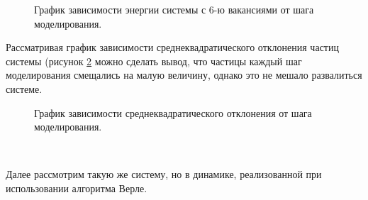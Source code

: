 \documentclass[14pt,a4paper,report]{ncc}
\begin{document}
\begin{figure}[h]
\caption{График зависимости энергии системы с 6-ю вакансиями от шага моделирования.}
\label{ris:image8}
\end{figure}
Рассматривая график зависимости среднеквадратического отклонения частиц системы (рисунок \ref{ris:image9} можно сделать вывод, что частицы каждый шаг моделирования смещались на малую величину, однако это не мешало развалиться системе. 
\begin{figure}[h]
\caption{График зависимости среднеквадратического отклонения от шага моделирования.}
\label{ris:image9}
\end{figure}
\

Далее рассмотрим такую же систему, но в динамике, реализованной при использовании алгоритма Верле.
\
\end{document}
